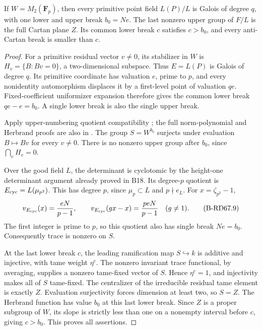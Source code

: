 \begin{lemma}
\label{lem:B-RD67-final-plane}
If \(W=M_2(\mathbf F_p)\), then every primitive point field
\(L(P)/L\) is Galois of degree \(q\), with one lower and upper
break \(b_0=Ne\). The last nonzero upper group of \(F/L\) is
the full Cartan plane \(Z\). Its common lower break \(c\) satisfies
\(c>b_0\), and every anti-Cartan break is smaller than \(c\).
\end{lemma}
\begin{proof}
For a primitive residual vector \(v\ne0\), its stabilizer in
\(W\) is \(H_v=\{B:Bv=0\}\), a two-dimensional subspace.
Thus \(E=L(P)\) is Galois of degree \(q\). Its primitive
coordinate has valuation \(e\), prime to \(p\), and every
nonidentity automorphism displaces it by a first-level point
of valuation \(qe\). Fixed-coefficient uniformizer expansion
therefore gives the common lower break \(qe-e=b_0\).
A single lower break is also the single upper break.

Apply upper-numbering quotient compatibility
\cite[\S3.1, Proposition 3, p.~128]{Serre1961LocalClosed};
the full norm-polynomial and Herbrand proofs are also in
\cite[Proposition 3.7, Theorem 3.10 and Proposition 3.13,
pp.~14--16]{ColmezCorpsLocaux}.
The group \(S=W^{b_0}\) surjects under evaluation
\(B\mapsto Bv\) for every \(v\ne0\). There is no nonzero upper
group after \(b_0\), since \(\bigcap_v H_v=0\).

Over the good field \(L\), the determinant is cyclotomic by
the height-one determinant argument already proved in B18.
Its degree-\(p\) quotient is \(E_{\rm cyc}=L(\mu_{p^2})\).
This has degree \(p\), since \(\mu_p\subset L\) and \(p\nmid e_L\).
For \(x=\zeta_{p^2}-1\),
\[
 v_{E_{\rm cyc}}(x)=\frac{eN}{p-1},\qquad
 v_{E_{\rm cyc}}(gx-x)=\frac{peN}{p-1}\quad(g\ne1).
 \tag{B-RD67.9}
\]
The first integer is prime to \(p\), so this quotient also has
single break \(Ne=b_0\). Consequently trace is nonzero on \(S\).

At the last lower break \(c\), the leading ramification map
\(S\hookrightarrow k\) is additive and injective, with tame
weight \(\eta^c\). The nonzero invariant trace functional,
by averaging, supplies a nonzero tame-fixed vector of \(S\).
Hence \(\eta^c=1\), and injectivity makes all of \(S\) tame-fixed.
The centralizer of the irreducible residual tame element is
exactly \(Z\). Evaluation surjectivity forces dimension at least
two, so \(S=Z\). The Herbrand function has value \(b_0\) at
this last lower break. Since \(Z\) is a proper subgroup of \(W\),
its slope is strictly less than one on a nonempty interval before
\(c\), giving \(c>b_0\). This proves all assertions.
\end{proof}

